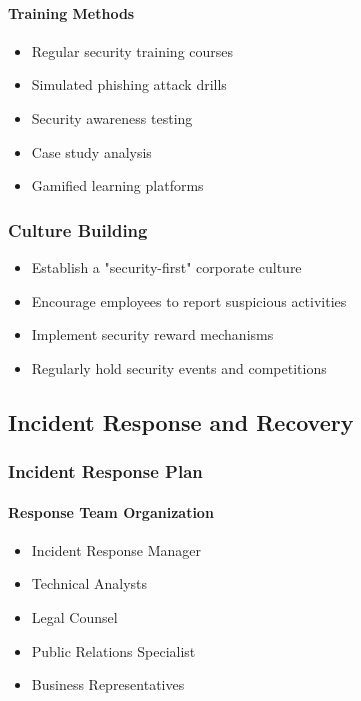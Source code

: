 \documentclass[12pt,a4paper]{article}
\begin{document}
\paragraph{Training Methods}
\begin{itemize}
    \item Regular security training courses
    \item Simulated phishing attack drills
    \item Security awareness testing
    \item Case study analysis
    \item Gamified learning platforms
\end{itemize}

\subsubsection{Culture Building}
\begin{itemize}
    \item Establish a "security-first" corporate culture
    \item Encourage employees to report suspicious activities
    \item Implement security reward mechanisms
    \item Regularly hold security events and competitions
\end{itemize}

\subsection{Incident Response and Recovery}

\subsubsection{Incident Response Plan}

\paragraph{Response Team Organization}
\begin{itemize}
    \item Incident Response Manager
    \item Technical Analysts
    \item Legal Counsel
    \item Public Relations Specialist
    \item Business Representatives
\end{itemize}
\end{document}
